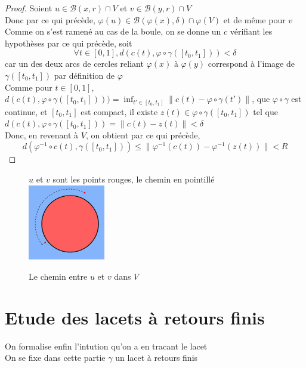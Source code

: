 \documentclass{article}
\begin{document}
\begin{flushleft}
\begin{proof}
    Soient $u \in \mathcal{B}(x, r) \cap V$ et $v \in \mathcal{B}(y, r) \cap V$\\
    Donc par ce qui précède, $\varphi(u) \in \mathcal{B}(\varphi(x), \delta) \cap \varphi(V)$ et de même pour $v$\\
    Comme on s'est ramené au cas de la boule, on se donne un $c$ vérifiant les hypothèses par ce qui précède, soit
    \[ \forall t \in [0, 1], d(c(t), \varphi \circ \gamma([t_0, t_1])) < \delta \]
    car un des deux arcs de cercles reliant $\varphi(x)$ à $\varphi(y)$ correspond à l'image de $\gamma([t_0, t_1])$ par
    définition de $\varphi$\\
    Comme pour $t \in [0, 1]$, $d(c(t), \varphi \circ \gamma([t_0, t_1]))) = \inf_{t' \in [t_0, t_1]} \| c(t) - \varphi \circ \gamma(t') \|$,
    que $\varphi \circ \gamma$ est continue, et $[t_0, t_1]$ est compact, il existe $z(t) \in \varphi \circ \gamma([t_0, t_1])$ tel que
    $d(c(t), \varphi \circ \gamma([t_0, t_1])) = \| c(t) - z(t) \| < \delta$\\
    Donc, en revenant à $V$, on obtient par ce qui précède,
    \[ d(\varphi^{-1} \circ c(t), \gamma([t_0, t_1])) \leq \| \varphi^{-1}(c(t)) - \varphi^{-1}(z(t)) \| < R \]
\end{proof}

\begin{figure}[h]
    \caption{Le chemin entre $u$ et $v$ dans $V$}
    \centering
    $u$ et $v$ sont les points rouges, le chemin en pointillé\\
    \includegraphics[width = 0.3\textwidth]{Chemin radial.png}
\end{figure}



\section{Etude des lacets à retours finis}

On formalise enfin l'intution qu'on a en tracant le lacet\\
On se fixe dans cette partie $\gamma$ un lacet à retours finis


\end{flushleft}
\end{document}
